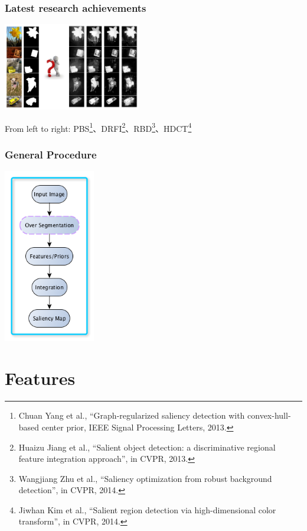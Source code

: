 \documentclass[notheorems,serif,table,compress]{beamer}  %
\begin{document}
\begin{frame}
\frametitle{Latest research achievements}
\centering\includegraphics[width=6cm]{latest}

  From left to right: PBS\footnote{Chuan Yang et al., ``Graph-regularized saliency detection with convex-hull-based center prior, IEEE Signal Processing Letters, 2013.}、DRFI\footnote{Huaizu Jiang et al., ``Salient object detection: a discriminative regional feature integration approach'', in CVPR, 2013.}、RBD\footnote{Wangjiang Zhu et al., ``Saliency optimization from robust background detection'', in CVPR, 2014.}、HDCT\footnote{Jiwhan Kim et al., ``Salient region detection via high-dimensional color transform'', in CVPR, 2014.}
\end{frame}


\begin{frame}
\frametitle{General Procedure}
\centering\includegraphics[width=4cm]{flowchart.png}
\end{frame}


\section{Features}
\end{document}
